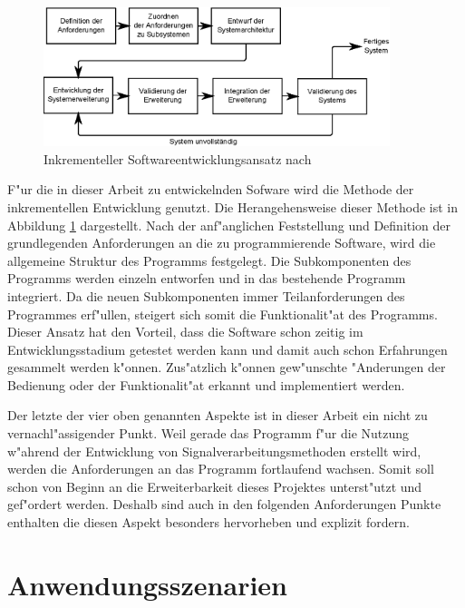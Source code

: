 \begin{figure}
\centering
\includegraphics[width=0.9\textwidth]{bilder/inkrementelle_entwicklung.eps}
\caption{Inkrementeller Softwareentwicklungsansatz nach \cite{Sommerville2001a}}
\label{pic:inkrementelle_entwicklung}
\end{figure}
F"ur die in dieser Arbeit zu entwickelnden Sofware wird die Methode der inkrementellen Entwicklung genutzt.
Die Herangehensweise dieser Methode ist in Abbildung \ref{pic:inkrementelle_entwicklung} dargestellt.
Nach der anf"anglichen Feststellung und Definition der grundlegenden Anforderungen an die zu programmierende Software, wird die allgemeine Struktur des Programms festgelegt.
Die Subkomponenten des Programms werden einzeln entworfen und in das bestehende Programm integriert.
Da die neuen Subkomponenten immer Teilanforderungen des Programmes erf"ullen, steigert sich somit die Funktionalit"at des Programms.
Dieser Ansatz hat den Vorteil, dass die Software schon zeitig im Entwicklungsstadium getestet werden kann und damit auch schon Erfahrungen gesammelt werden k"onnen.
Zus"atzlich k"onnen gew"unschte "Anderungen der Bedienung oder der Funktionalit"at erkannt und implementiert werden.

Der letzte der vier oben genannten Aspekte ist in dieser Arbeit ein nicht zu vernachl"assigender Punkt.
Weil gerade das Programm f"ur die Nutzung w"ahrend der Entwicklung von Signalverarbeitungsmethoden erstellt wird, werden die Anforderungen an das Programm fortlaufend wachsen.
Somit soll schon von Beginn an die Erweiterbarkeit dieses Projektes unterst"utzt und gef"ordert werden.
Deshalb sind auch in den folgenden Anforderungen Punkte enthalten die diesen Aspekt besonders hervorheben und explizit fordern.


\section{Anwendungsszenarien}

